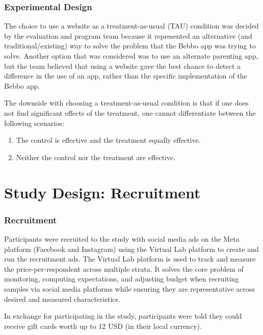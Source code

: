 \documentclass[aspectratio=169]{beamer}
\begin{document}
\begin{frame}
    \frametitle{Experimental Design}

The choice to use a website as a treatment-as-usual (TAU) condition was decided by the evaluation and program team because it represented an alternative (and traditional/existing) way to solve the problem that the Bebbo app was trying to solve. Another option that was considered was to use an alternate parenting app, but the team believed that using a website gave the best chance to detect a difference in the use of an app, rather than the specific implementation of the Bebbo app.  

The downside with choosing a treatment-as-usual condition is that if one does not find significant effects of the treatment, one cannot differentiate between the following scenarios: 

\begin{enumerate}
\item The control is effective and the treatment equally effective. 
\item Neither the control nor the treatment are effective. 
\end{enumerate}
    

\end{frame}

\section{Study Design: Recruitment}

\begin{frame}
  \frametitle{Recruitment}

Participants were recruited to the study with social media ads on the Meta platform (Facebook and Instagram) using the Virtual Lab platform to create and run the recruitment ads. The Virtual Lab platform is used to track and measure the price-per-respondent across multiple strata. It solves the core problem of monitoring, computing expectations, and adjusting budget when recruiting samples via social media platforms while ensuring they are representative across desired and measured characteristics.  

In exchange for participating in the study, participants were told they could receive gift cards worth up to 12 USD (in their local currency).

\end{frame}
\end{document}
